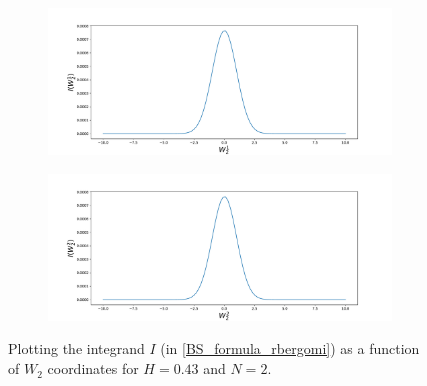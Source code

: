 \documentclass[11pt]{article}
\begin{document}
\begin{figure}[h!]
	\centering
	\begin{subfigure}{.5\textwidth}
		\centering
		\includegraphics[width=1\linewidth]{./figures/integrand_plotting_rBergomi/1D_plots/N_2/H_043/Bergomi_integrand_K_1_H_043_W21_N_2}
		\caption{}
		\label{fig:sub3}
	\end{subfigure}%
	\begin{subfigure}{.5\textwidth}
		\centering
		\includegraphics[width=1\linewidth]{./figures/integrand_plotting_rBergomi/1D_plots/N_2/H_043/Bergomi_integrand_K_1_H_043_W22_N_2}
		\caption{}
		\label{fig:sub4}
	\end{subfigure}
	\caption{Plotting the integrand $I$ (in \eqref{BS_formula_rbergomi}) as a function of $W_2$ coordinates for $H=0.43$ and $N=2$.}
	\label{fig:Integrand_H_043_N_2_W_2}
\end{figure}
\end{document}
